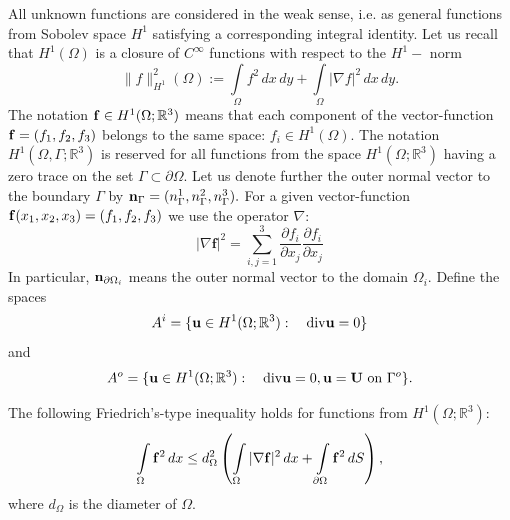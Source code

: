 \documentclass{amsart}
\begin{document}
All unknown functions are considered in the weak sense, i.e. as general functions from Sobolev space $H^1$ satisfying a corresponding integral identity.
Let us recall that $H^1(\Omega)$ is a closure of $C^{\infty}$ functions with respect to the $H^1-$ norm
$$\|f\|^2_{H^1}(\Omega):=\int\limits_{\Omega}f^2\,dx\,dy+\int\limits_{\Omega}|\nabla f|^2\,dx\,dy.$$
The notation
${\bf f}\in H^1(\Omega;\mathbb{R}^3)$ means that each component of the  vector-function ${\bf f}=(f_1,f_2,f_3)$ belongs to the same space:  $f_i\in
H^1(\Omega).$ The notation $H^1(\Omega,\Gamma;\mathbb{R}^3)$ is reserved for all functions from the space $H^1(\Omega;\mathbb{R}^3)$ having a zero trace on the set $\Gamma\subset
\partial\Omega.$ Let us denote further the outer normal vector to the boundary $\Gamma$ by ${\bf n}_{\Gamma}=(n^1_{\Gamma},n^2_{\Gamma}, n^3_{\Gamma}).$
%
For a given vector-function ${\bf f}(x_1,x_2,x_3)=(f_1,f_2,f_3)$ we use the operator $\nabla:$
$$|\nabla \mathbf f|^2=\sum\limits_{i,j=1}^3\frac{\partial f_i}{\partial x_j}\frac{\partial f_i}{\partial x_j}$$
In particular, ${\bf n}_{\partial \Omega_i}$ means the outer normal vector to the domain $\Omega_i.$
Define the spaces $$A^{i}=\{{\bf u}\in H^1(\Omega;\mathbb{R}^3):\quad \mathrm{div}{\bf \mathbf u}=0\}$$ and
$$A^{o}=\{{\bf u}\in H^1(\Omega;\mathbb{R}^3): \quad \mathrm{div}{\bf \mathbf u}=0,{\bf \mathbf u}={\bf \mathbf U}\text{
on } \Gamma^o\}.$$

The following Friedrich's-type inequality holds for functions from $H^1(\Omega;\mathbb{R}^3):$
\begin{equation}\label{Friedr}
\int\limits_{\Omega}{\bf f}^2\,dx\leq d^2_{\Omega}\left(\int\limits_{\Omega}|\nabla{\bf f}|^2\,dx+\int\limits_{\partial\Omega}{\bf f}^2\,dS\right),
\end{equation}
where $d_{\Omega}$ is the diameter of $\Omega.$

\end{document}
